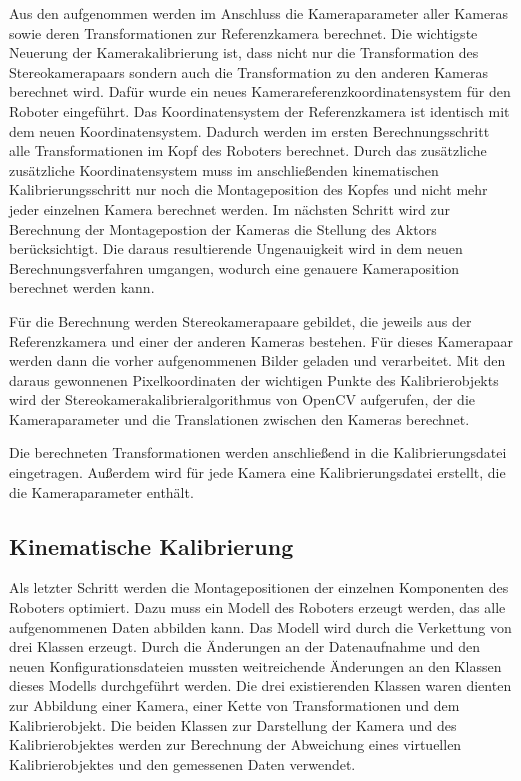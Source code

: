 Aus den aufgenommen werden im Anschluss die Kameraparameter aller Kameras sowie
deren Transformationen zur Referenzkamera berechnet. Die wichtigste Neuerung der 
Kamerakalibrierung ist, dass nicht nur die Transformation des Stereokamerapaars
sondern auch die Transformation zu den anderen Kameras berechnet wird. Dafür 
wurde ein neues Kamerareferenzkoordinatensystem für den Roboter eingeführt. Das
Koordinatensystem der Referenzkamera ist identisch mit dem neuen Koordinatensystem.
Dadurch werden im ersten Berechnungsschritt alle Transformationen im Kopf des 
Roboters berechnet. Durch das zusätzliche zusätzliche Koordinatensystem muss 
im anschließenden kinematischen Kalibrierungsschritt nur noch die Montageposition
des Kopfes und nicht mehr jeder einzelnen Kamera berechnet werden. Im nächsten
Schritt wird zur Berechnung der Montagepostion der Kameras die Stellung des 
Aktors berücksichtigt. Die daraus resultierende Ungenauigkeit wird in dem neuen
Berechnungsverfahren umgangen, wodurch eine genauere Kameraposition berechnet
werden kann. 

Für die Berechnung werden Stereokamerapaare gebildet, die jeweils aus der
Referenzkamera und einer der anderen Kameras bestehen. Für dieses 
Kamerapaar werden dann die vorher aufgenommenen Bilder geladen und 
verarbeitet. Mit den daraus gewonnenen Pixelkoordinaten der wichtigen Punkte 
des Kalibrierobjekts wird der Stereokamerakalibrieralgorithmus von OpenCV 
aufgerufen, der die Kameraparameter und die Translationen zwischen den Kameras 
berechnet. 

Die berechneten Transformationen werden anschließend in die Kalibrierungsdatei
eingetragen. Außerdem wird für jede Kamera eine Kalibrierungsdatei erstellt,
die die Kameraparameter enthält.


\subsection{Kinematische Kalibrierung}
\label{sub:Kinematische Kalibrierung_umsetzung}

Als letzter Schritt werden die Montagepositionen der einzelnen Komponenten des 
Roboters optimiert. Dazu muss ein Modell des Roboters erzeugt werden, das 
alle aufgenommenen Daten abbilden kann. Das Modell wird durch die Verkettung
von drei Klassen erzeugt. Durch die Änderungen an der Datenaufnahme
und den neuen Konfigurationsdateien mussten weitreichende Änderungen an den 
Klassen dieses Modells durchgeführt werden. Die drei existierenden Klassen 
waren dienten zur Abbildung einer Kamera, einer Kette von Transformationen und
dem Kalibrierobjekt. Die beiden Klassen zur Darstellung der Kamera und des 
Kalibrierobjektes werden zur Berechnung der Abweichung eines virtuellen
Kalibrierobjektes und den gemessenen Daten verwendet.


